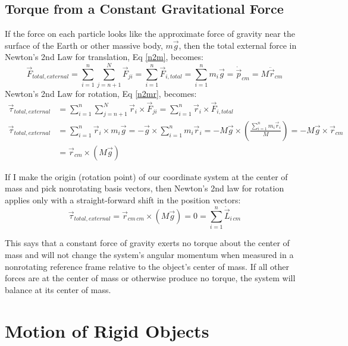 \documentclass[10pt]{article}
\begin{document}
\subsection{Torque from a Constant Gravitational Force}

If the force on each particle looks like the approximate force 
of gravity near the surface of the Earth or other massive body, $m\vec{g}$,
then the total external force in Newton's 2nd Law for translation, 
Eq \ref{n2m}, becomes:
\begin{equation*}
    \vec{F}_{total,external} = \sum_{i=1}^n\sum_{j=n+1}^N\vec{F}_{ji} = 
        \sum_{i=1}^n \vec{F}_{i,total} = \sum_{i=1}^n 
        m_i\vec{g} = \dot{\vec{p}}_{cm} = 
        M\ddot{\vec{r}}_{cm}
\end{equation*}
Newton's 2nd Law for rotation, Eq \ref{n2mr}, becomes:
\begin{align*}
    \vec{\tau}_{total,external} &= \sum_{i=1}^n\sum_{j=n+1}^N\vec{r}_i\times
        \vec{F}_{ji} = \sum_{i=1}^n\vec{r}_i\times\vec{F}_{i,total} \\
    \vec{\tau}_{total,external} &=
        \sum_{i=1}^n\vec{r}_i\times m_i\vec{g} = 
        -\vec{g}\times\sum_{i=1}^n m_i\vec{r}_i =
        -M\vec{g}\times\left(\frac{\sum_{i=1}^n m_i\vec{r}_i}{M}\right) = 
        -M\vec{g}\times\vec{r}_{cm} \\
    &= \vec{r}_{cm}\times\left(M\vec{g}\right)
\end{align*}

If I make the origin (rotation point) 
of our coordinate system at the center of mass and pick 
nonrotating basis vectors, then Newton's 2nd law for rotation applies only
with a straight-forward shift in the position vectors:
\begin{equation}
    \vec{\tau}_{total,external} = \vec{r}_{cm\,cm}\times\left(M\vec{g}\right) 
        = 0 = \sum_{i=1}^n \dot{\vec{L}}_{i\,cm}
\end{equation}

This says that a constant force of gravity exerts no torque about the 
center of mass and will not change the system's angular momentum when 
measured in a nonrotating reference frame relative to the object's 
center of mass. If all other forces are at the 
center of mass or otherwise produce no torque, the system will balance at 
its center of mass.

\section{Motion of Rigid Objects}
\end{document}
